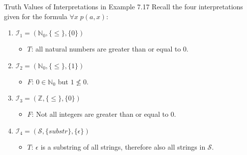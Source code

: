 \documentclass[style=sailor,size=12pt,mode=present]{powerdot}
\theoremstyle{definition}
\newenvironment{ex}[1]
  {\renewcommand\theinnerexample{#1}\innerexample}
  {\endinnerexample}
\newcommand{\bb}[1]{\mathbb{#1}}
\newcommand{\Z}{\bb{Z}}
\newcommand{\N}{\bb{N}}
\begin{document}
\begin{wideslide}[bm=,toc=]{Truth Values of Interpretations in Example 7.17}
\begin{ex}{7.21}
Recall the four interpretations given for the formula $\forall x \; p(a,x)$:
\end{ex}
\vspace*{-2ex}
\begin{enumerate}
\item<2-> $\mathcal{I}_1 = (\N_0,\{\leq\},\{0\})$
\begin{itemize}
\item<3-> $T$: all natural numbers are greater than or equal to $0$.
\end{itemize}
\item<4-> $\mathcal{I}_2 = (\N_0,\{\leq\},\{1\})$
\begin{itemize}
\item<5-> $F$: $0 \in \N_0$ but $1 \not \leq 0$. 
\end{itemize}
\item<6-> $\mathcal{I}_3 = (\Z,\{\leq\},\{0\})$
\begin{itemize}
\item<7-> $F$: Not all integers are greater than or equal to $0$.
\end{itemize}
\item<8-> $\mathcal{I}_4 = (\mathcal{S},\{substr\},\{ \epsilon \})$
\begin{itemize}
\item<9-> $T$: $\epsilon$ is a substring of all strings, therefore also all
strings in $\mathcal{S}$. 
\end{itemize}
\end{enumerate}
\end{wideslide}
\end{document}
